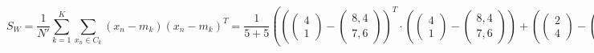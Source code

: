 \documentclass[a4paper,parskip=full-]{article}
\begin{document}
$$
S_W = \frac{1}{N'} \sum^K_{k=1} \sum_{x_n \in C_k} (x_n-m_k)(x_n-m_k)^T
= \frac{1}{5+5} \left(
\left( \begin{pmatrix} 4 \\ 1 \end{pmatrix} - \begin{pmatrix} 8,4 \\ 7,6 \end{pmatrix} \right)^T \cdot
\left( \begin{pmatrix} 4 \\ 1 \end{pmatrix} - \begin{pmatrix} 8,4 \\ 7,6 \end{pmatrix} \right) +
\left( \begin{pmatrix} 2 \\ 4 \end{pmatrix} - \begin{pmatrix} 8,4 \\ 7,6 \end{pmatrix} \right)^T \cdot
\left( \begin{pmatrix} 2 \\ 4 \end{pmatrix} - \begin{pmatrix} 8,4 \\ 7,6 \end{pmatrix} \right) +
\left( \begin{pmatrix} 2 \\ 3 \end{pmatrix} - \begin{pmatrix} 8,4 \\ 7,6 \end{pmatrix} \right)^T \cdot
\left( \begin{pmatrix} 2 \\ 3 \end{pmatrix} - \begin{pmatrix} 8,4 \\ 7,6 \end{pmatrix} \right) +
\left( \begin{pmatrix} 3 \\ 6 \end{pmatrix} - \begin{pmatrix} 8,4 \\ 7,6 \end{pmatrix} \right)^T \cdot
\left( \begin{pmatrix} 3 \\ 6 \end{pmatrix} - \begin{pmatrix} 8,4 \\ 7,6 \end{pmatrix} \right) +
$$
\end{document}
